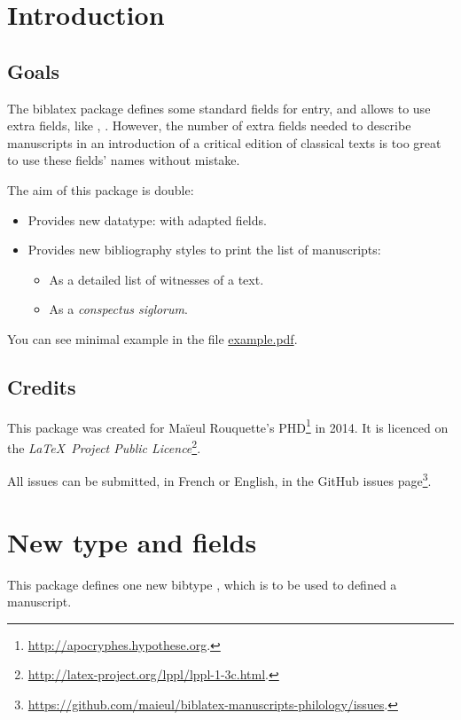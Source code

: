 \documentclass{ltxdockit}[2011/03/25]
\newcommand{\biblatex}{biblatex\xspace}
\begin{document}
\printtitlepage
\tableofcontents
\section{Introduction}
\subsection{Goals}
The \biblatex package defines some standard fields for entry, and allows to use extra fields, like , . However, the number of extra fields needed to describe manuscripts in an introduction of a critical edition of classical texts is too great to use these fields' names without mistake.

The aim of this package is double:

\begin{itemize}
\item Provides new datatype:  with adapted fields.
\item Provides new bibliography styles to print the list of manuscripts:
\begin{itemize}
	\item As a detailed list of witnesses of a text.
	\item As a \emph{conspectus siglorum}.
\end{itemize}
\end{itemize}

You can see minimal example in the file \href{file:example.pdf}{example.pdf}.
\subsection{Credits}

This package was created for Maïeul Rouquette's PHD\footnote{\url{http://apocryphes.hypothese.org}.} in 2014. It is licenced on the \emph{\LaTeX\ Project Public Licence}\footnote{\url{http://latex-project.org/lppl/lppl-1-3c.html}.}.

All issues can be submitted, in French or English, in the GitHub issues page\footnote{\url{https://github.com/maieul/biblatex-manuscripts-philology/issues}.}.


\section{New type and fields}

This package defines one new bibtype , which is to be used to defined a manuscript.
\end{document}
